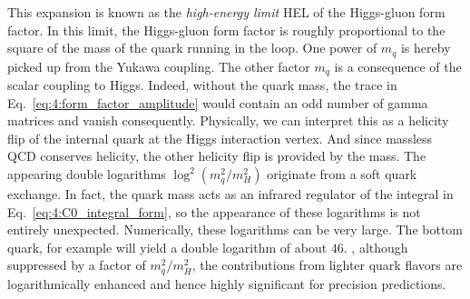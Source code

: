 This expansion is known as the \textit{high-energy limit} \acs{HEL} of the Higgs-gluon form factor. In this limit, the Higgs-gluon form factor is roughly proportional to the square of the mass of the quark running in the loop. One power of $m_q$ is hereby picked up from the Yukawa coupling. The other factor $m_q$ is a consequence of the scalar coupling to Higgs. Indeed, without the quark mass, the trace in Eq.~\eqref{eq:4:form_factor_amplitude} would contain an odd number of gamma matrices and vanish consequently. Physically, we can interpret this as a helicity flip of the internal quark at the Higgs interaction vertex. And since massless \acs{QCD} conserves helicity, the other helicity flip is provided by the mass. The appearing double logarithms $\log^2 (m_q^2/m_H^2)$ originate from a soft quark exchange. In fact, the quark mass acts as an infrared regulator of the integral in Eq.~\ref{eq:4:C0_integral_form}, so the appearance of these logarithms is not entirely unexpected. Numerically, these logarithms can be very large. The bottom quark, for example will yield a double logarithm of about $46$. \Ie, although suppressed by a factor of $m_q^2/m_H^2$, the contributions from lighter quark flavors are logarithmically enhanced and hence highly significant for precision predictions.

